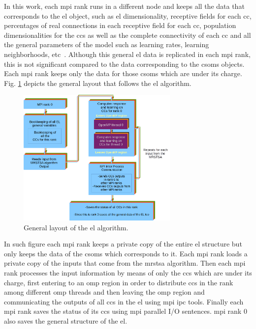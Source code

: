 \documentclass[10pt,journal,compsoc]{IEEEtran}
\begin{document}
In this work, each \gls{mpi} rank runs in a different node and keeps all the data that corresponds to the \gls{el} object, such as \gls{el} dimensionality, receptive fields for each \gls{cc}, percentages of real connections in each receptive field for each \gls{cc}, population dimensionalities for the \glspl{cc} as well as the complete connectivity of each \gls{cc} and all the general parameters of the model such as learning rates, learning neighborhoods, etc~\cite{Dematties2018}. Although this general \gls{el} data is replicated in each \gls{mpi} rank, this is not significant compared to the data corresponding to the \glspl{csom} objects. Each \gls{mpi} rank keeps only the data for those \glspl{csom} which are under its charge. Fig. \ref{fig:EL_ALG} depicts the general layout that follows the \gls{el} algorithm.

\begin{figure}[ht]
    \centering
    \includegraphics[width=0.7\textwidth]{EL_ALG.png}
    \caption{General layout of the \gls{el} algorithm.} 
    \label{fig:EL_ALG}
\end{figure}

In such figure each \gls{mpi} rank keeps a private copy of the entire \gls{el} structure but only keeps the data of the \glspl{csom} which corresponds to it. Each \gls{mpi} rank loads a private copy of the inputs that come from the \gls{mrstsa} algorithm. Then each \gls{mpi} rank processes the input information by means of only the \glspl{cc} which are under its charge, first entering to an \gls{omp} region in order to distribute \glspl{cc} in the rank among different \gls{omp} threads and then leaving the \gls{omp} region and communicating the outputs of all \glspl{cc} in the \gls{el} using \gls{mpi} \gls{ipc} tools. Finally each \gls{mpi} rank saves the status of its \glspl{cc} using \gls{mpi} parallel I/O sentences. \gls{mpi} rank 0 also saves the general structure of the \gls{el}.
\end{document}
